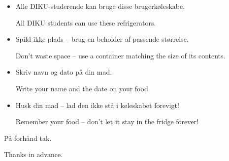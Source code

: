 \documentclass{article}
\begin{document}
\maketitle

\null
\vspace{-2cm}


\huge

\vspace{-1cm}

\dansk

\begin{itemize}

\item Alle DIKU-studerende kan bruge disse brugerkøleskabe.

\english All DIKU students can use these refrigerators.

\dansk \item Spild ikke plads -- brug en beholder af passende størrelse.

\english Don't waste space -- use a container matching the size of its contents.

\dansk \item Skriv navn og dato på din mad.

\english Write your name and the date on your food.

\dansk \item Husk din mad -- lad den ikke stå i køleskabet forevigt!

\english Remember your food -- don't let it stay in the fridge forever!

\end{itemize}

\begin{center}

\huge

På forhånd tak. \\

\english

Thanks in advance.

\vspace{-1cm}

\end{center}

\underskriv
\end{document}
